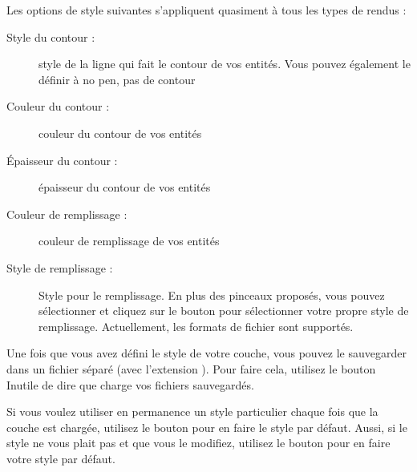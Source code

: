 Les options de style suivantes s'appliquent quasiment à tous les types de rendus :
\begin{description}
\item[Style du contour :] style de la ligne qui fait le contour de vos entités. Vous pouvez également le définir à no pen, pas de contour
\item[Couleur du contour :] couleur du contour de vos entités
\item[Épaisseur du contour :] épaisseur du contour de vos entités
\item[Couleur de remplissage :] couleur de remplissage de vos entités
\item[Style de remplissage :] Style pour le remplissage. En plus des pinceaux proposés, vous pouvez sélectionner  et cliquez sur le \browsebutton bouton pour sélectionner votre propre style de remplissage. Actuellement, les formats de fichier  sont supportés.
\end{description}

Une fois que vous avez défini le style de votre couche, vous pouvez le sauvegarder dans un fichier séparé (avec l'extension ). Pour faire cela, utilisez le bouton  Inutile de dire que  charge vos fichiers sauvegardés.

Si vous voulez utiliser en permanence un style particulier chaque fois que la couche est chargée, utilisez le bouton  pour en faire le style par défaut. Aussi, si le style ne vous plait pas et que vous le modifiez, utilisez le bouton  pour en faire votre style par défaut.

